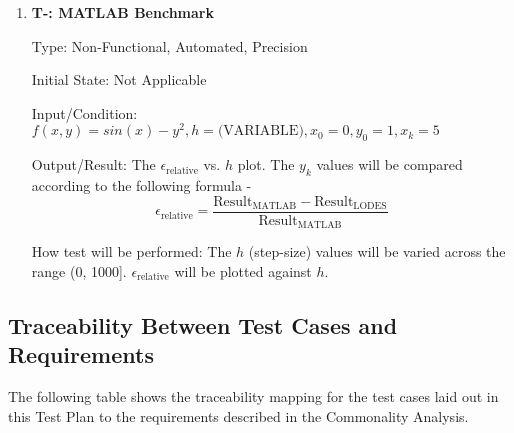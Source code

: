 \documentclass[12pt, titlepage]{article}
\newcounter{tnum} %
\newcommand{\famname}{LODES} %
\begin{document}
\begin{enumerate}

\item{\textbf{T-\thetnum \label{t-benchmark}: MATLAB Benchmark}}

Type: Non-Functional, Automated, Precision 
					
Initial State: Not Applicable
					
Input/Condition: $f(x, y) = sin(x) - y^2, h = \text{(VARIABLE)}, x_0 = 0, y_0 = 1, x_k = 5$
					
Output/Result: The $\epsilon_{\text{relative}}$ vs. $h$ plot.
The $y_k$ values will be compared according to the following formula -
$$\epsilon_{\text{relative}} = \frac{\text{Result}_\text{MATLAB} - \text{Result}_\text{\famname{}}} {\text{Result}_\text{MATLAB}} $$
					
How test will be performed: The $h$ (step-size) values will be varied across the range (0, 1000]. 
$\epsilon_{\text{relative}}$ will be plotted against $h$.

\end{enumerate}

%
%					
%					
%					
%					

%

\subsection{Traceability Between Test Cases and Requirements}
The following table shows the traceability mapping for the test cases laid out in this Test Plan to the requirements described in the Commonality Analysis.
\end{document}
